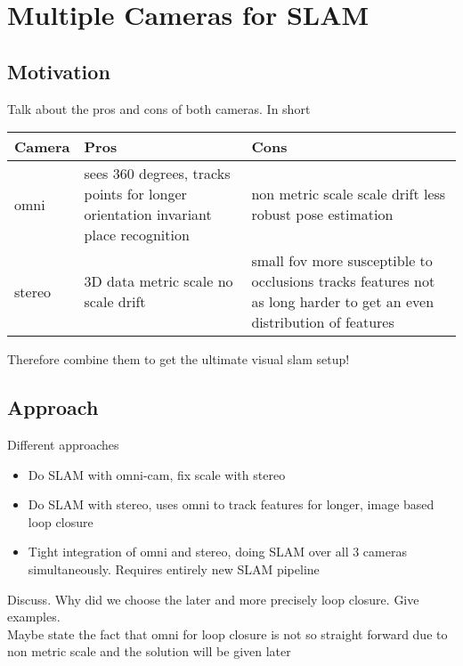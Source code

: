 \chapter{Multiple Cameras for SLAM}
\label{chapter:MultiCamSLAM}

\section{Motivation}

Talk about the pros and cons of both cameras.  In short

\begin{center}
 \begin{tabular}{ | l | p{5.5cm} | p{5.5cm} | }
  \hline
  \bf Camera & \bf Pros & \bf Cons \\ \hline
  omni 
  & sees 360 degrees, \newline 
  tracks points for longer \newline
  orientation invariant place recognition
  & non metric scale \newline 
  scale drift \newline less robust pose estimation\\ \hline
  
  stereo 
  & 3D data \newline metric scale \newline no scale drift
  & small fov \newline
  more susceptible to occlusions \newline 
  tracks features not as long \newline 
  harder to get an even distribution of features \\ \hline
 \end{tabular}

\end{center}


Therefore combine them to get the ultimate visual slam setup!

\section{Approach}

Different approaches
\begin{itemize}
 \item Do SLAM with omni-cam, fix scale with stereo
 \item Do SLAM with stereo, uses omni to track features for longer, image based loop closure
 \item Tight integration of omni and stereo, doing SLAM over all 3 cameras simultaneously. 
Requires entirely new SLAM pipeline
\end{itemize}

Discuss.  Why did we choose the later and more precisely loop closure.
Give examples.
\\

Maybe state the fact that omni for loop closure is not so straight forward due to non metric scale and the solution will be given later